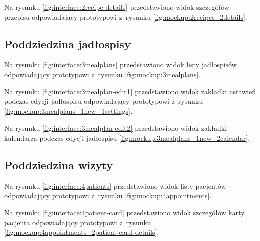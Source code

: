 Na rysunku \ref{fig:interface:2recipe-details} przedstawiono widok szczegółów przepisu odpowiadający prototypowi z~rysunku \ref{fig:mockup:2recipes_2details}.


\subsection{Poddziedzina jadłospisy}

Na rysunku \ref{fig:interface:3mealplans} przedstawiono widok listy jadłospisów odpowiadający prototypowi z~rysunku \ref{fig:mockup:3mealplans}.


Na rysunku \ref{fig:interface:3mealplan-edit1} przedstawiono widok zakładki ustawień podczas edycji jadłospisu odpowiadający prototypowi z~rysunku \ref{fig:mockup:3mealplans_1new_1settings}.


Na rysunku \ref{fig:interface:3mealplan-edit2} przedstawiono widok zakładki kalendarza podczas edycji jadłospisu \ref{fig:mockup:3mealplans_1new_2calendar}.



\subsection{Poddziedzina wizyty}

Na rysunku \ref{fig:interface:4patients} przedstawiono widok listy pacjentów odpowiadający prototypowi z~rysunku \ref{fig:mockup:4appointments}.



Na rysunku \ref{fig:interface:4patient-card} przedstawiono widok szczegółów karty pacjenta odpowiadający prototypowi z~rysunku \ref{fig:mockup:4appointments_2patient-card-details}.


